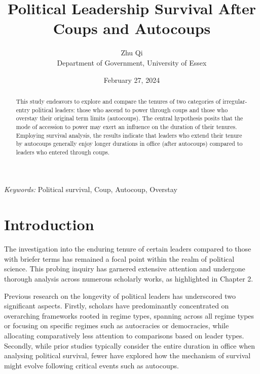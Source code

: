 \documentclass[
  12pt,
  a4paper,
  12pt]{article}
\begin{document}
\def\spacingset#1{\renewcommand{\baselinestretch}%
{#1}\small\normalsize} \spacingset{1}



\date{February 27, 2024}
\title{\bf Political Leadership Survival After Coups and Autocoups}
\author{
Zhu Qi\\
Department of Government, University of Essex\\
}
\maketitle

\bigskip
\bigskip
\begin{abstract}
This study endeavors to explore and compare the tenures of two
categories of irregular-entry political leaders: those who ascend to
power through coups and those who overstay their original term limits
(autocoups). The central hypothesis posits that the mode of accession to
power may exert an influence on the duration of their tenures. Employing
survival analysis, the results indicate that leaders who extend their
tenure by autocoups generally enjoy longer durations in office (after
autocoups) compared to leaders who entered through coups.
\end{abstract}

\noindent%
{\it Keywords:} Political survival, Coup, Autocoup, Overstay
\vfill

\newpage
\spacingset{1.9} %

\section{Introduction}\label{introduction}

The investigation into the enduring tenure of certain leaders compared
to those with briefer terms has remained a focal point within the realm
of political science. This probing inquiry has garnered extensive
attention and undergone thorough analysis across numerous scholarly
works, as highlighted in Chapter 2.

Previous research on the longevity of political leaders has underscored
two significant aspects. Firstly, scholars have predominantly
concentrated on overarching frameworks rooted in regime types, spanning
across all regime types or focusing on specific regimes such as
autocracies or democracies, while allocating comparatively less
attention to comparisons based on leader types. Secondly, while prior
studies typically consider the entire duration in office when analysing
political survival, fewer have explored how the mechanism of survival
might evolve following critical events such as autocoups.
\end{document}
